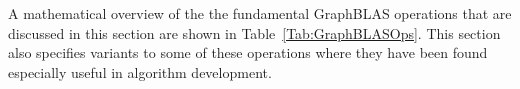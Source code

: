 \documentclass[11pt]{extarticle}
\begin{document}
A mathematical overview of the the fundamental GraphBLAS operations that are
discussed in this section are shown in Table~\ref{Tab:GraphBLASOps}.  This
section also specifies variants to some of these operations where they have
been found especially useful in algorithm development.











\appendix


%
%
\end{document}
